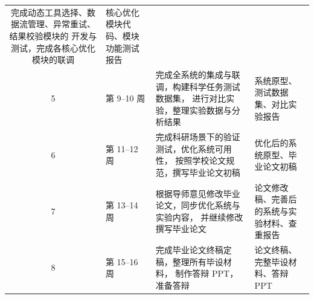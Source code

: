 \begin{table}[htbp]
\begin{tabular}{clll}
\begin{minipage}[t]{0.32\textwidth}
              完成动态工具选择、数据流管理、异常重试、结果校验模块的
              开发与测试，完成各核心优化模块的联调
            \end{minipage}
          & \begin{minipage}[t]{0.22\textwidth}
              核心优化模块代码、模块功能测试报告
            \end{minipage} \\[2ex]
        5 & 第 9--10 周
          & \begin{minipage}[t]{0.32\textwidth}
              完成全系统的集成与联调，构建科学任务测试数据集，
              进行对比实验，整理实验数据与分析结果
            \end{minipage}
          & \begin{minipage}[t]{0.22\textwidth}
              系统原型、测试数据集、对比实验报告
            \end{minipage} \\[2ex]
        6 & 第 11--12 周
          & \begin{minipage}[t]{0.32\textwidth}
              完成科研场景下的验证测试，优化系统可用性，
              按照学校论文规范，撰写毕业论文初稿
            \end{minipage}
          & \begin{minipage}[t]{0.22\textwidth}
              优化后的系统原型、毕业论文初稿
            \end{minipage} \\[2ex]
        7 & 第 13--14 周
          & \begin{minipage}[t]{0.32\textwidth}
              根据导师意见修改毕业论文，同步优化系统与实验内容，
              并继续修改撰写毕业论文
            \end{minipage}
          & \begin{minipage}[t]{0.22\textwidth}
              论文修改稿、完善后的系统与实验材料、查重报告
            \end{minipage} \\[2ex]
        8 & 第 15--16 周
          & \begin{minipage}[t]{0.32\textwidth}
              完成毕业论文终稿定稿，整理所有毕设材料，
              制作答辩 PPT，准备答辩
            \end{minipage}
          & \begin{minipage}[t]{0.22\textwidth}
              论文终稿、完整毕设材料、答辩 PPT
            \end{minipage} \\
        \bottomrule
    \end{tabular}
\end{table}

